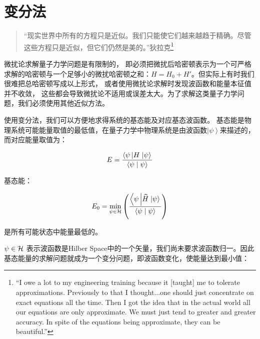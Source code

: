 \section{变分法}

\begin{quotation}
“现实世界中所有的方程只是近似。我们只能使它们越来越趋于精确。尽管这些方程只是近似，但它们仍然是美的。”\qquad 狄拉克\footnote{``I owe a lot to my engineering training because it [taught] me to tolerate approximations. Previously to that I thought...one should just concentrate on exact equations all the time. Then I got the idea that in the actual world all our equations are only approximate. We must just tend to greater and greater accuracy. In spite of the equations being approximate, they can be beautiful.''}

\end{quotation}

微扰论求解量子力学问题是有限制的，
即必须把微扰后哈密顿表示为一个可严格求解的哈密顿与一个足够小的微扰哈密顿之和：$H = H_0  + H'$。但实际上有时我们很难把总哈密顿写成以上形式，
或者使用微扰论求解时发现波函数和能量本征值并不收敛，
这些都会导致微扰论不适用或误差太大。为了求解这类量子力学问题，我们必须使用其他近似方法。

使用变分法，我们可以方便地求得系统的基态能及对应基态波函数。
基态能是物理系统可能能量取值的最低值，在量子力学中物理系统是由波函数$\left| \psi  \right\rangle $来描述的，而对应能量取值为：

\begin{equation}\label{23-1}
E = \frac{{\left\langle {\psi \left| H \right.\left| \psi  \right\rangle } \right.}}{{\left\langle {\psi }
 \mathrel{\left | {\vphantom {\psi  \psi }}
 \right. \kern-\nulldelimiterspace}
 {\psi } \right\rangle }}
\end{equation}

基态能：

\begin{equation}\label{23-2}
E_0  = \mathop {\min }\limits_{\psi  \in \cal{H}} \left( {\frac{{\left\langle {\psi \left| {\widehat H} \right.\left| \psi  \right\rangle } \right.}}{{\left\langle {\psi }
 \mathrel{\left | {\vphantom {\psi  \psi }}
 \right. \kern-\nulldelimiterspace}
 {\psi } \right\rangle }}} \right)
\end{equation}

是所有可能状态中能量最低的。

$\psi  \in \cal{H}$ 表示波函数是Hilber Space中的一个矢量，我们尚未要求波函数归一。因此基态能量的求解问题就成为一个变分问题，即波函数变化，使能量达到最小值：

